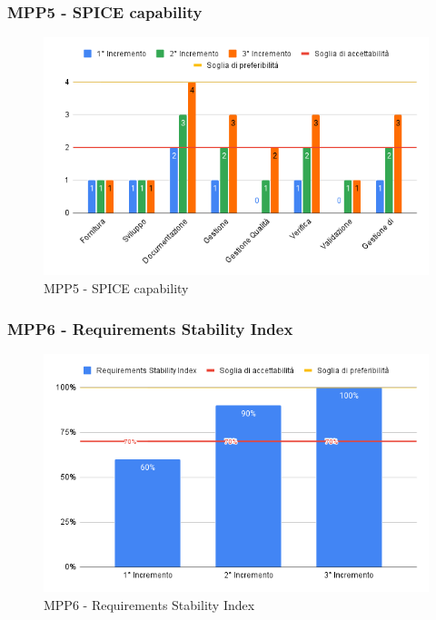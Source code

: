 \subsubsection{MPP5 - SPICE capability}

\begin{figure}[H]
	\centering
	\includegraphics[scale = 0.6]{sezioni/Images/SPICECapability.png}
	\caption{MPP5 - SPICE capability}
\end{figure}

\subsubsection{MPP6 - Requirements Stability Index}

\begin{figure}[H]
	\centering
	\includegraphics[scale = 0.6]{sezioni/Images/RequirementsStabilityIndex.png}
	\caption{MPP6 - Requirements Stability Index}
\end{figure}

